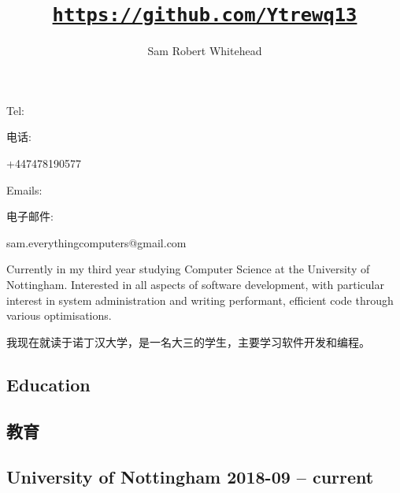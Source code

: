     \title{\href{https://github.com/Ytrewq13}{\texttt{https://github.com/Ytrewq13}}}
    \author{Sam Robert Whitehead}

    \maketitle

    \pagestyle{empty}

\begin{xen}
    Tel:
\end{xen}
\begin{xcn}
    电话:
\end{xcn}
    +447478190577
    \hfill
\begin{xen}
    Emails:
\end{xen}
\begin{xcn}
    电子邮件:
\end{xcn}
    sam.everythingcomputers@gmail.com\\
    {}
    \vspace{1mm}
\begin{xen}
    Currently in my third year studying Computer Science at the University of
    Nottingham. Interested in all aspects of software development, with
    particular interest in system administration and writing performant,
    efficient code through various optimisations.
\end{xen}
\begin{xcn}
    我现在就读于诺丁汉大学，是一名大三的学生，主要学习软件开发和编程。
\end{xcn}
\begin{xen}
    \section{Education}
\end{xen}
\begin{xcn}
    \section{教育}
\end{xcn}
\begin{xen}
    \subsection{University of Nottingham
        \hfill 2018-09 -- current}
\end{xen}

